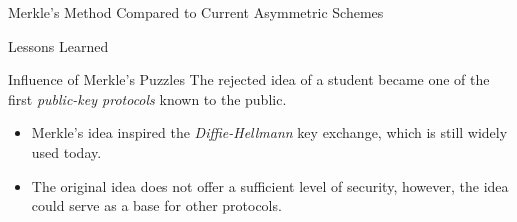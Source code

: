 \documentclass[final]{beamer}
\begin{document}
\begin{frame}[fragile]
\begin{columns}[t]
\begin{rightcolumn}
\begin{boxblock}{Merkle's Method Compared to Current Asymmetric Schemes}
%     


 

   \end{boxblock}

   \begin{boxblock}{Lessons Learned}
 
 \justifying
      	\begin{alertblock}{Influence of Merkle's Puzzles}
      			\justifying
      		The rejected idea of a student became one of the first \emph{public-key protocols} known to the public. 
      	\end{alertblock}
      
      \begin{itemize}
      	\item Merkle's idea inspired the \emph{Diffie-Hellmann} key exchange, which is still widely used today.
      	\item The original idea does not offer a sufficient level of security, however, the idea could serve as a base for other protocols.
         
      \end{itemize}
      
      
   \end{boxblock}

   \begin{footnotesize}
   

\end{footnotesize}
\end{rightcolumn}
\end{columns}
\end{frame}
\end{document}
